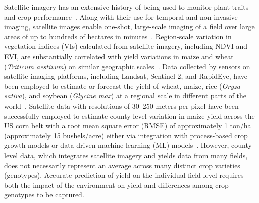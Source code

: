 \documentclass[12pt,twoside]{gsag3jnl}
\begin{document}

Satellite imagery has an extensive history of being used to monitor plant traits and crop performance~\citep{macdonald1980global}. Along with their use for temporal and non-invasive imaging, satellite images enable one-shot, large-scale imaging of a field over large areas of up to hundreds of hectares in minutes~\citep{dalla2015durum}. Region-scale variation in vegetation indices (VIs) calculated from satellite imagery, including NDVI and EVI, are substantially correlated with yield variations in maize and wheat (\textit{Triticum aestivum}) on similar geographic scales~\citep{funk2009phenologically, lopresti2015relationship}. Data collected by sensors on satellite imaging platforms, including Landsat, Sentinel 2, and RapidEye, have been employed to estimate or forecast the yield of wheat, maize, rice (\textit{Oryza sativa}), and soybean (\textit{Glycine max}) at a regional scale in different parts of the world~\citep{hamar1996yield, wang2010large, noureldin2013rice,kamir2020estimating, goyal2024efficient}. Satellite data with resolutions of 30--250 meters per pixel have been successfully employed to estimate county-level variation in maize yield across the US corn belt with a root mean square error (RMSE) of approximately 1 ton/ha (approximately 15 bushels/acre) either via integration with process-based crop growth models or data-driven machine learning (ML) models~\citep{jin2017improving,schwalbert2020mid}. However, county-level data, which integrates satellite imagery and yields data from many fields, does not necessarily represent an average across many distinct crop varieties (genotypes). Accurate prediction of yield on the individual field level requires both the impact of the environment on yield and differences among crop genotypes to be captured. 
\end{document}
